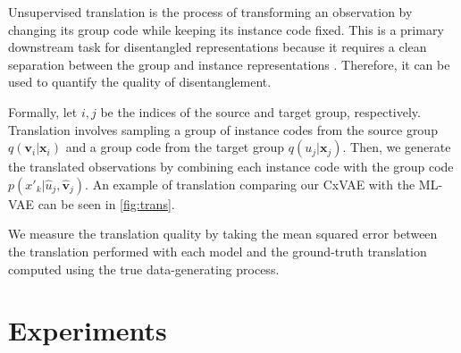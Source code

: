 \documentclass[nohyperref]{article}
\theoremstyle{plain}
\theoremstyle{definition}
\theoremstyle{remark}
\begin{document}
Unsupervised translation is the process of transforming an observation by changing its group code while keeping its instance code fixed. This is a primary downstream task for disentangled representations because it requires a clean separation between the group and instance representations \citep{Tenenbaum2000SeparatingSA}. Therefore, it can be used to quantify the quality of disentanglement.

Formally, let $i, j$ be the indices of the source and target group, respectively. Translation involves sampling a group of instance codes from the source group $q(\mathbf{v}_i | \mathbf{x}_i)$ and a group code from the target group $q(u_j | \mathbf{x}_j)$. Then, we generate the translated observations by combining each instance code with the group code $p(x'_{k} | \hat{u}_j, \hat{\mathbf{v}}_j)$. An example of translation comparing our CxVAE with the ML-VAE \citep{Bouchacourt2018MultiLevelVA} can be seen in \cref{fig:trans}.

We measure the translation quality by taking the mean squared error between the translation performed with each model and the ground-truth translation computed using the true data-generating process.

\section{Experiments}
\end{document}
